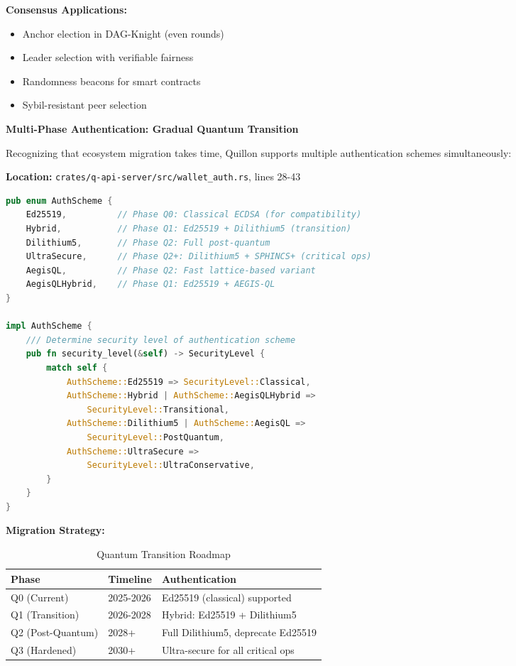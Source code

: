 \documentclass[11pt,a4paper]{article}
\begin{document}
\textbf{Consensus Applications:}
\begin{itemize}[leftmargin=*]
\item Anchor election in DAG-Knight (even rounds)
\item Leader selection with verifiable fairness
\item Randomness beacons for smart contracts
\item Sybil-resistant peer selection
\end{itemize}

\textbf{Multi-Phase Authentication: Gradual Quantum Transition}

Recognizing that ecosystem migration takes time, Quillon supports multiple authentication schemes simultaneously:

\textbf{Location:} \texttt{crates/q-api-server/src/wallet\_auth.rs}, lines 28-43

\begin{lstlisting}[language=Rust,caption={Multi-Phase Authentication Scheme Support}]
pub enum AuthScheme {
    Ed25519,          // Phase Q0: Classical ECDSA (for compatibility)
    Hybrid,           // Phase Q1: Ed25519 + Dilithium5 (transition)
    Dilithium5,       // Phase Q2: Full post-quantum
    UltraSecure,      // Phase Q2+: Dilithium5 + SPHINCS+ (critical ops)
    AegisQL,          // Phase Q2: Fast lattice-based variant
    AegisQLHybrid,    // Phase Q1: Ed25519 + AEGIS-QL
}

impl AuthScheme {
    /// Determine security level of authentication scheme
    pub fn security_level(&self) -> SecurityLevel {
        match self {
            AuthScheme::Ed25519 => SecurityLevel::Classical,
            AuthScheme::Hybrid | AuthScheme::AegisQLHybrid =>
                SecurityLevel::Transitional,
            AuthScheme::Dilithium5 | AuthScheme::AegisQL =>
                SecurityLevel::PostQuantum,
            AuthScheme::UltraSecure =>
                SecurityLevel::UltraConservative,
        }
    }
}
\end{lstlisting}

\textbf{Migration Strategy:}
\begin{table}[h]
\centering
\begin{tabular}{@{}lll@{}}
\toprule
\textbf{Phase} & \textbf{Timeline} & \textbf{Authentication} \\ \midrule
Q0 (Current) & 2025-2026 & Ed25519 (classical) supported \\
Q1 (Transition) & 2026-2028 & Hybrid: Ed25519 + Dilithium5 \\
Q2 (Post-Quantum) & 2028+ & Full Dilithium5, deprecate Ed25519 \\
Q3 (Hardened) & 2030+ & Ultra-secure for all critical ops \\
\bottomrule
\end{tabular}
\caption{Quantum Transition Roadmap}
\end{table}
\end{document}
